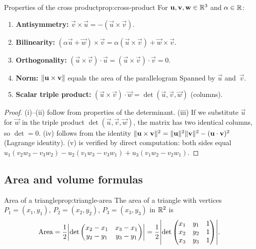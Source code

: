 \begin{proposition}{Properties of the cross product}{prop:cross-product}
For $\mathbf{u},\mathbf{v},\mathbf{w}\in{\mathbb{R}}^3$ and $\alpha\in{\mathbb{R}}$:
\begin{enumerate}[label=(\roman*)]
  \item \textbf{Antisymmetry:}
    $\vec{v}\times\vec{u} = -(\vec{u}\times\vec{v})$.
  \item \textbf{Bilinearity:}
    $(\alpha\vec{u}+\vec{w})\times\vec{v}
    = \alpha(\vec{u}\times\vec{v})+\vec{w}\times\vec{v}$.
  \item \textbf{Orthogonality:}
    $(\vec{u}\times\vec{v})\cdot\vec{u}
    = (\vec{u}\times\vec{v})\cdot\vec{v} = 0$.
  \item \textbf{Norm:}
    $\lVert\mathbf{u}\times\mathbf{v}\rVert$ equals the area of the
    parallelogram Spanned by $\vec{u}$ and~$\vec{v}$.
  \item \textbf{Scalar triple product:}
    $(\vec{u}\times\vec{v})\cdot\vec{w}
    = \det(\vec{u},\vec{v},\vec{w})$ (columns).
\end{enumerate}
\end{proposition}

\begin{proof}
(i)--(ii) follow from properties of the determinant.
(iii) If we substitute $\vec{u}$ for $\vec{w}$ in the triple product
$\det(\vec{u},\vec{v},\vec{w})$, the matrix has two identical columns,
so $\det=0$.
(iv) follows from the identity
$\lVert\mathbf{u}\times\mathbf{v}\rVert^2 = \lVert\mathbf{u}\rVert^2\lVert\mathbf{v}\rVert^2
- (\mathbf{u}\cdot\mathbf{v})^2$ (Lagrange identity).
(v) is verified by direct computation: both sides equal
$u_1(v_2 w_3-v_3 w_2) - u_2(v_1 w_3-v_3 w_1) + u_3(v_1 w_2-v_2 w_1)$.
\end{proof}

\subsection{Area and volume formulas}\label{subsec:area-volume}

\begin{proposition}{Area of a triangle}{prop:triangle-area}
The area of a triangle with vertices $P_1=(x_1,y_1)$,
$P_2=(x_2,y_2)$, $P_3=(x_3,y_3)$ in ${\mathbb{R}}^2$ is
\[
  \text{Area} = \frac{1}{2}\abs*{\det\begin{pmatrix}
    x_2-x_1 & x_3-x_1 \\
    y_2-y_1 & y_3-y_1
  \end{pmatrix}}
  = \frac{1}{2}\abs*{\det\begin{pmatrix}
    x_1 & y_1 & 1 \\
    x_2 & y_2 & 1 \\
    x_3 & y_3 & 1
  \end{pmatrix}}.
\]
\end{proposition}

